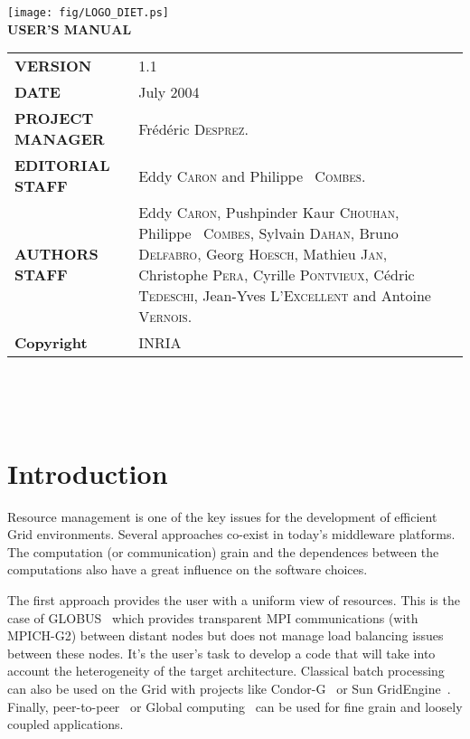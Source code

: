 \documentclass[12pt,a4paper]{book}
\newcommand{\dietversion}{1.1}
\begin{document}

\thispagestyle{empty}
\vspace*{3cm}
\vspace*{3cm}

\begin{center}
\texttt{[image: fig/LOGO\_DIET.ps]}\\[2ex]
\textbf{\Huge USER'S MANUAL\\[2ex]}
\end{center}

\vfill

\noindent
\small{
\begin{tabular}{ll}
  \textbf{VERSION}  & \dietversion\\
  \textbf{DATE}     & July 2004\\
  \textbf{PROJECT MANAGER}  & Fr\'ed\'eric \textsc{Desprez}.\\
  \textbf{EDITORIAL STAFF}  & Eddy \textsc{Caron} and Philippe ~\textsc{Combes}.\\
  \textbf{AUTHORS STAFF}    & 
\begin{minipage}[t]{12cm}
  Eddy \textsc{Caron}, Pushpinder Kaur \textsc{Chouhan}, Philippe ~\textsc{Combes},
  Sylvain \textsc{Dahan}, Bruno \textsc{Delfabro}, Georg \textsc{Hoesch}, Mathieu \textsc{Jan}, Christophe \textsc{Pera}, Cyrille \textsc{Pontvieux}, C\'edric \textsc{Tedeschi}, Jean-Yves \textsc{L'Excellent} and Antoine \textsc{Vernois}.
\end{minipage} \\
  \textbf{Copyright}& INRIA
\end{tabular}\\
}

\newpage
\thispagestyle{empty}
\ 



\newpage
\tableofcontents


%
%
\newpage
{}
\chapter*{Introduction}

Resource management is one of the key issues for the development of
efficient Grid environments. Several approaches co-exist in today's
middleware platforms. The computation (or communication) grain and the
dependences between the computations also have a great influence on
the software choices.

The first approach provides the user with a uniform view of
resources. This is the case of GLOBUS~\cite{Globus} which provides
transparent MPI communications (with MPICH-G2) between distant nodes
but does not manage load balancing issues between these nodes. It's
the user's task to develop a code that will take into account the
heterogeneity of the target architecture. Classical batch processing
can also be used on the Grid with projects like Condor-G~\cite{Condor}
or Sun GridEngine~\cite{SunGridEngine}. Finally,
peer-to-peer~\cite{Oram01} or Global computing~\cite{germain01global}
can be used for fine grain and loosely coupled applications.
\end{document}
